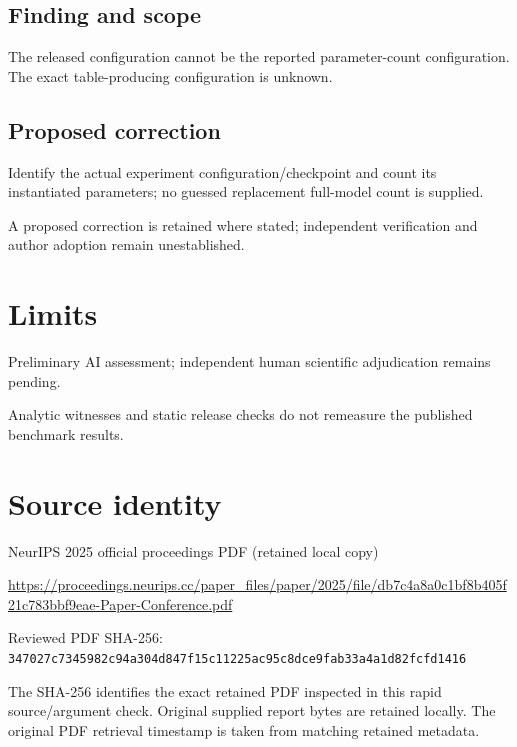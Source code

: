 \documentclass[11pt]{article}
\begin{document}
\subsection*{Finding and scope}

The released configuration cannot be the reported parameter-count configuration. The exact table-producing configuration is unknown.

\subsection*{Proposed correction}

Identify the actual experiment configuration/checkpoint and count its instantiated parameters; no guessed replacement full-model count is supplied.

A proposed correction is retained where stated; independent verification and author adoption remain unestablished.

\section*{Limits}

Preliminary AI assessment; independent human scientific adjudication remains pending.\par

Analytic witnesses and static release checks do not remeasure the published benchmark results.\par

\section*{Source identity}

NeurIPS 2025 official proceedings PDF (retained local copy)

\url{https://proceedings.neurips.cc/paper_files/paper/2025/file/db7c4a8a0c1bf8b405f21c783bbf9eae-Paper-Conference.pdf}

Reviewed PDF SHA-256: \nolinkurl{347027c7345982c94a304d847f15c11225ac95c8dce9fab33a4a1d82fcfd1416}

The SHA-256 identifies the exact retained PDF inspected in this rapid source/argument check. Original supplied report bytes are retained locally. The original PDF retrieval timestamp is taken from matching retained metadata.
\end{document}
